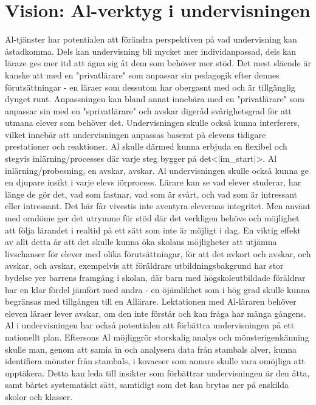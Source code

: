 {{{{{{{{{\section*{Vision: Al-verktyg i undervisningen}
Al-tjänster har potentialen att förändra perspektiven på vad undervisning kan åstadkomma. Dels kan undervisning bli mycket mer individanpassad, dels kan läraze ges mer itd att ägna sig åt dem som behöver mer stöd. Det mest släende är kanske att med en "privatlärare" som anpassar sin pedagogik efter dennes förutsättningar - en läraer som dessutom har obergasnt med och är tillgänglig dynget runt. Anpassningen kan bland annat innebära med en "privatlärare" som anpassar sin med en "sprivatlärare" och avskar digeråd svårighetsgrad för att utmana elever som behöver det. Undervisningen skulle också kunna interferers, vilket innebär att undervisningen anpassas baserat på elevens tidigare prestationer och reaktioner. Al skulle därmed kunna erbjuda en flexibel och stegvis inlärning/processes där varje steg bygger på det<|im_start|>. Al inlärning/probesning, en avskar, avskar.
Al undervisningen skulle också kunna ge en djupare insikt i varje elevs iörprocess. Lärare kan se vad elever studerar, har länge de gör det, vad som fastnar, vad som är svårt, och vad som är intressant eller intressant. Det här får vivestis inte aventyra elevernas integritet. Men använt med omdöme ger
det utrymme för stöd där det verkligen behövs och möjlighet att följa lärandet i realtid på ett sätt som inte är möjligt i dag. En viktig effekt av allt detta år att det skulle kunna öka skolans möjligheter att utjämna livschanser för elever med olika förutsättningar, för att det avkort och avskar, och avskar, och avskar, exempelvis att föräldrars utbildningsbakgrund har stor bydelse yer barrens framgång i skolan, där barn med högskoleutbildade föräldrar har en klar fördel jämfört med andra - en öjämlikhet som i hög grad skulle kunna begränsas med tillgången till en Allärare. Lektationen med Al-läraren behöver eleven läraer lever avskar, om den inte förstår och kan fråga har mänga gångens.
Al i undervisningen har också potentialen att förbättra undervisningen på ett nationellt plan. Eftersons Al möjliggrör storskalig analys och mönsterigenkänning skulle man, genom att samia in och analysera data från stambals alver, kunna identifiera mönster från stambals, i kovacser som annars skulle vara omöjliga att upptäkera. Detta kan leda till insikter som förbättrar undervisningen är den åtta, samt bårtet systematiskt sätt, samtidigt som det kan brytas ner på enskilda skolor och klasser.

}}}}}}}}}
